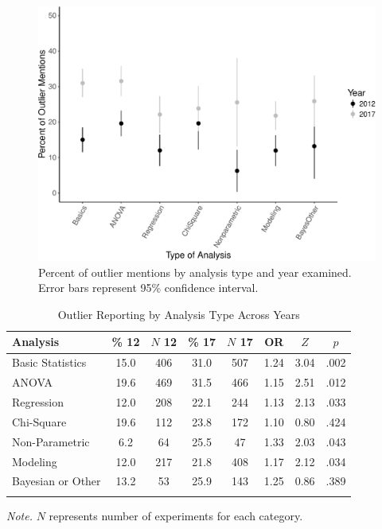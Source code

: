 \documentclass[english,,man]{apa6}
\begin{document}
\begin{figure}
\centering
\includegraphics{outliers_manuscript_files/figure-latex/analyses-graph-1.pdf}
\caption{\label{fig:analyses-graph}Percent of outlier mentions by analysis type and year examined. Error bars represent 95\% confidence interval.}
\end{figure}

\begin{table}[tbp]
\begin{center}
\begin{threeparttable}
\caption{\label{tab:analysis-table}Outlier Reporting by Analysis Type Across Years}
\begin{tabular}{lccccccc}
\toprule
Analysis & \% 12 & $N$ 12 & \% 17 & $N$ 17 & OR & $Z$ & $p$\\
\midrule
Basic Statistics & 15.0 & 406 & 31.0 & 507 & 1.24 & 3.04 & .002\\
ANOVA & 19.6 & 469 & 31.5 & 466 & 1.15 & 2.51 & .012\\
Regression & 12.0 & 208 & 22.1 & 244 & 1.13 & 2.13 & .033\\
Chi-Square & 19.6 & 112 & 23.8 & 172 & 1.10 & 0.80 & .424\\
Non-Parametric & 6.2 & 64 & 25.5 & 47 & 1.33 & 2.03 & .043\\
Modeling & 12.0 & 217 & 21.8 & 408 & 1.17 & 2.12 & .034\\
Bayesian or Other & 13.2 & 53 & 25.9 & 143 & 1.25 & 0.86 & .389\\
\bottomrule
\addlinespace
\end{tabular}
\begin{tablenotes}[para]
\normalsize{\textit{Note.} $N$ represents number of experiments for each category.}
\end{tablenotes}
\end{threeparttable}
\end{center}
\end{table}
\end{document}
